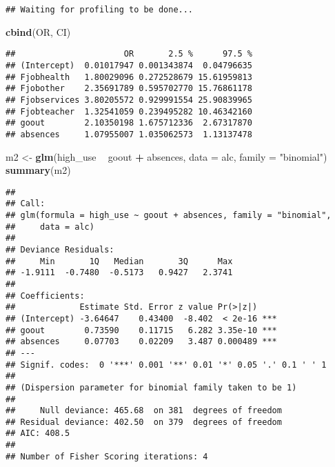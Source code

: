 \documentclass[]{article}
\newenvironment{Shaded}{\begin{snugshade}}{\end{snugshade}}
\newcommand{\DataTypeTok}[1]{\textcolor[rgb]{0.13,0.29,0.53}{#1}}
\newcommand{\KeywordTok}[1]{\textcolor[rgb]{0.13,0.29,0.53}{\textbf{#1}}}
\newcommand{\NormalTok}[1]{#1}
\newcommand{\OperatorTok}[1]{\textcolor[rgb]{0.81,0.36,0.00}{\textbf{#1}}}
\newcommand{\StringTok}[1]{\textcolor[rgb]{0.31,0.60,0.02}{#1}}
\begin{document}
\begin{verbatim}
## Waiting for profiling to be done...
\end{verbatim}

\begin{Shaded}
\begin{Highlighting}[]
\KeywordTok{cbind}\NormalTok{(OR, CI)}
\end{Highlighting}
\end{Shaded}

\begin{verbatim}
##                      OR       2.5 %      97.5 %
## (Intercept)  0.01017947 0.001343874  0.04796635
## Fjobhealth   1.80029096 0.272528679 15.61959813
## Fjobother    2.35691789 0.595702770 15.76861178
## Fjobservices 3.80205572 0.929991554 25.90839965
## Fjobteacher  1.32541059 0.239495282 10.46342160
## goout        2.10350198 1.675712336  2.67317870
## absences     1.07955007 1.035062573  1.13137478
\end{verbatim}

\begin{Shaded}
\begin{Highlighting}[]
\NormalTok{m2 <-}\StringTok{ }\KeywordTok{glm}\NormalTok{(high_use }\OperatorTok{~}\StringTok{ }\NormalTok{goout }\OperatorTok{+}\StringTok{ }\NormalTok{absences, }\DataTypeTok{data =}\NormalTok{ alc, }\DataTypeTok{family =} \StringTok{"binomial"}\NormalTok{)}
\KeywordTok{summary}\NormalTok{(m2)}
\end{Highlighting}
\end{Shaded}

\begin{verbatim}
## 
## Call:
## glm(formula = high_use ~ goout + absences, family = "binomial", 
##     data = alc)
## 
## Deviance Residuals: 
##     Min       1Q   Median       3Q      Max  
## -1.9111  -0.7480  -0.5173   0.9427   2.3741  
## 
## Coefficients:
##             Estimate Std. Error z value Pr(>|z|)    
## (Intercept) -3.64647    0.43400  -8.402  < 2e-16 ***
## goout        0.73590    0.11715   6.282 3.35e-10 ***
## absences     0.07703    0.02209   3.487 0.000489 ***
## ---
## Signif. codes:  0 '***' 0.001 '**' 0.01 '*' 0.05 '.' 0.1 ' ' 1
## 
## (Dispersion parameter for binomial family taken to be 1)
## 
##     Null deviance: 465.68  on 381  degrees of freedom
## Residual deviance: 402.50  on 379  degrees of freedom
## AIC: 408.5
## 
## Number of Fisher Scoring iterations: 4
\end{verbatim}

\begin{Shaded}
\end{Shaded}
\end{document}
